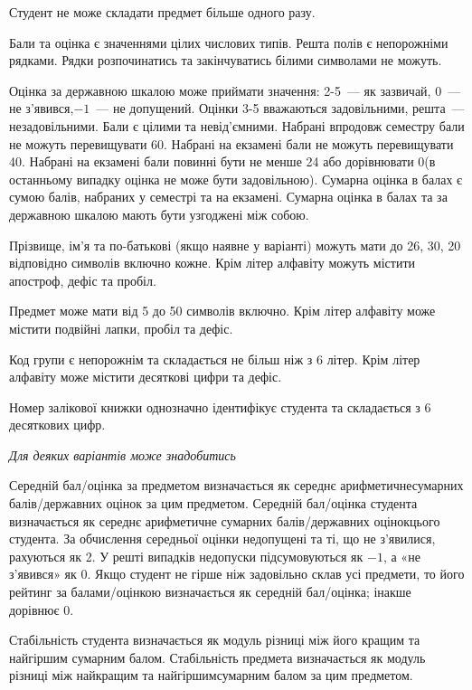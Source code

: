 \documentclass[11pt, ukrainian]{article}
\begin{document}
Студент не може складати предмет більше одного разу.

Бали та оцінка є значеннями цілих числових типів. Решта полів є непорожніми рядками.
Рядки розпочинатись та закінчуватись білими символами не можуть.

Оцінка за державною шкалою може приймати значення: 2-5~--- як зазвичай, 0~--- не з’явився,$-1$~--- не допущений. 
Оцінки 3-5 вважаються задовільними, решта~--- незадовільними. 
Бали є цілими та невід’ємними.
Набрані впродовж семестру бали не можуть перевищувати 60. 
Набрані на екзамені бали не можуть перевищувати 40. 
Набрані на екзамені бали повинні бути не менше 24 або дорівнювати 0(в останньому випадку оцінка не може бути задовільною). 
Сумарна оцінка в балах є сумою балів, набраних у семестрі та на екзамені.
Сумарна оцінка в балах та за державною шкалою мають бути узгоджені між собою.

Прізвище, ім’я та по-батькові (якщо наявне у варіанті) можуть мати до 26, 30, 20 відповідно символів включно кожне. 
Крім літер алфавіту можуть містити апостроф, дефіс та пробіл.

Предмет може мати від 5 до 50 символів включно. 
Крім літер алфавіту може містити подвійні лапки, пробіл та дефіс.

Код групи є непорожнім та складається не більш ніж з 6 літер. 
Крім літер алфавіту може містити десяткові цифри та дефіс.


Номер залікової книжки однозначно ідентифікує студента та складається з 6 десяткових цифр. 

\bigskip\textit{Для деяких варіантів може знадобитись}

Середній бал/оцінка за предметом визначається як середнє арифметичнесумарних балів/державних оцінок за цим предметом. 
Середній бал/оцінка студента визначається як середнє арифметичне сумарних балів/державних оцінокцього студента. 
За обчислення середньої оцінки недопущені та ті, що не з’явилися, рахуються як 2.
У решті випадків недопуски підсумовуються як $-1$, а «не з’явився» як 0.
Якщо студент не гірше ніж задовільно склав усі предмети, 
то його рейтинг за балами/оцінкою визначається як середній бал/оцінка; інакше дорівнює 0.

Стабільність студента визначається як модуль різниці між його кращим та найгіршим сумарним балом.
Стабільність предмета визначається як модуль різниці між найкращим та найгіршимсумарним балом за цим предметом.
\end{document}
